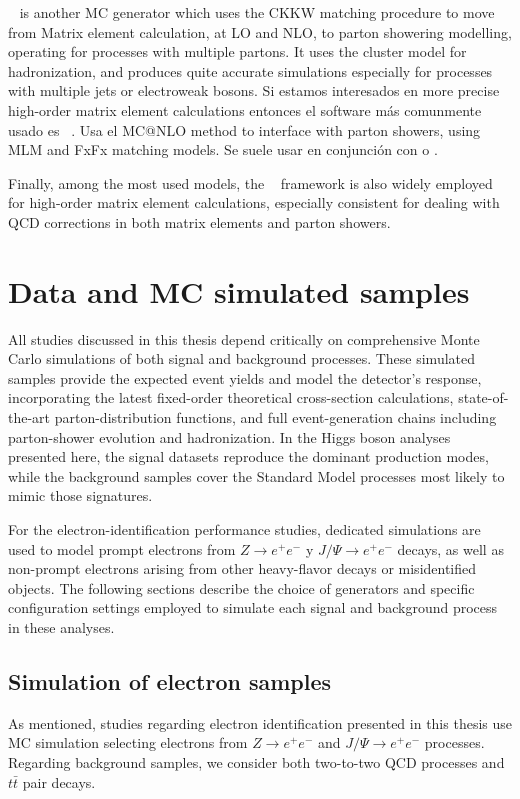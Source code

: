 \sherpa~\cite{Bothmann_2019} is another MC generator which uses the CKKW matching procedure to move from Matrix element calculation, at LO and NLO, to parton showering modelling, operating for processes with multiple partons. It uses the cluster model for hadronization, and produces quite accurate simulations especially for processes with multiple jets or electroweak bosons. 
Si estamos interesados en more precise high-order matrix element calculations entonces el software más comunmente usado es \madgraph~\cite{Alwall_2014}. Usa el \textsc{MC@NLO} method to interface with parton showers, using MLM and FxFx matching models. Se suele usar en conjunción con \pythia o \herwig.

Finally, among the most used models, the \powhegbox~\cite{Frixione_2007} framework is also widely employed for high-order matrix element calculations, especially consistent for dealing with QCD corrections in both matrix elements and parton showers.

\section{Data and MC simulated samples}
\label{sec:mc_samples}

All studies discussed in this thesis depend critically on comprehensive Monte Carlo simulations of both signal and background processes. These simulated samples provide the expected event yields and model the detector’s response, incorporating the latest fixed-order 
theoretical cross-section calculations, state-of-the-art parton-distribution functions, and full event-generation chains including parton-shower evolution and hadronization. In the Higgs boson analyses presented here, the signal datasets reproduce the dominant production modes, while the background samples cover the Standard Model processes most likely to mimic those signatures.

For the electron-identification performance studies, dedicated simulations are used to model prompt electrons from $Z \rightarrow e^{+}e^{-} $ y $J/\Psi \rightarrow e^{+}e^{-}$ decays, as well as non-prompt electrons arising from other heavy-flavor decays or misidentified objects. The following sections describe the choice of generators and specific configuration settings employed
to simulate each signal and background process in these analyses.

\subsection{Simulation of electron samples}
\label{subsec:electron_mc}
As mentioned, studies regarding electron identification presented in this thesis use MC simulation selecting electrons from $Z \rightarrow e^{+}e^{-} $ and $J/\Psi \rightarrow e^{+}e^{-}$ processes.
Regarding background samples, we consider both two-to-two QCD processes and $t\bar{t}$ pair decays.

